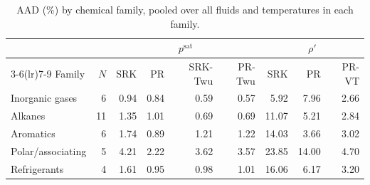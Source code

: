 \begin{table}[H]
\centering
\caption{AAD (\%) by chemical family, pooled over all fluids and temperatures in each family.}
\label{tab:family}
\small
\setlength{\tabcolsep}{4pt}
\begin{tabular}{lrrrrrrrr}
\toprule
 & & \multicolumn{4}{c}{$p^{\mathrm{sat}}$} & \multicolumn{3}{c}{$\rho'$} \\
\cmidrule(lr){3-6}\cmidrule(lr){7-9}
Family & $N$ & SRK & PR & SRK-Twu & PR-Twu & SRK & PR & PR-VT \\
\midrule
Inorganic gases & 6 & 0.94 & 0.84 & 0.59 & 0.57 & 5.92 & 7.96 & 2.66 \\
Alkanes & 11 & 1.35 & 1.01 & 0.69 & 0.69 & 11.07 & 5.21 & 2.84 \\
Aromatics & 6 & 1.74 & 0.89 & 1.21 & 1.22 & 14.03 & 3.66 & 3.02 \\
Polar/associating & 5 & 4.21 & 2.22 & 3.62 & 3.57 & 23.85 & 14.00 & 4.70 \\
Refrigerants & 4 & 1.61 & 0.95 & 0.98 & 1.01 & 16.06 & 6.17 & 3.20 \\
\bottomrule
\end{tabular}
\end{table}
